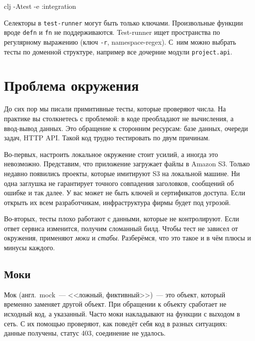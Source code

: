 \begin{english}
  \begin{bash}
clj -Atest -e :integration
  \end{bash}
\end{english}

Селекторы в \verb|test-runner| могут быть только ключами. Произвольные функции
вроде \verb|defn| и \verb|fn| не поддерживаются. Test-runner ищет пространства
по регулярному выражению (ключ \verb|-r|, namespace-regex). С~ним можно выбрать
тесты по доменной структуре, например все дочерние модули \verb|project.api|.

\section{Проблема окружения}


До сих пор мы писали примитивные тесты, которые проверяют числа. На практике вы
столкнетесь с проблемой: в коде преобладают не вычисления, а ввод-вывод
данных. Это обращение к сторонним ресурсам: базе данных, очереди задач, HTTP
API. Такой код трудно тестировать по двум причинам.


Во-первых, настроить локальное окружение стоит усилий, а иногда это
невозможно. Представим, что приложение загружает файлы в Amazon S3. Только недавно
появились проекты, которые имитируют S3 на локальной машине. Ни одна заглушка не
гарантирует точного совпадения заголовков, сообщений об ошибке и так далее. У
вас может не быть ключей и сертификатов доступа. Если открыть их всем
разработчикам, инфраструктура фирмы будет под угрозой.

Во-вторых, тесты плохо работают с данными, которые не контролируют. Если ответ
сервиса изменится, получим сломанный билд. Чтобы тест не зависел от окружения,
применяют \emph{моки} и \emph{стабы}. Разберёмся, что это такое и в чём плюсы и
минусы каждого.

\subsection{Моки}

\label{test-isolation}


Мок (англ.~mock~--- <<ложный, фиктивный>>)~--- это объект, который временно
заменяет другой объект. При обращении к объекту сработает не исходный код, а
указанный. Часто моки накладывают на функции с выходом в сеть. С их помощью
проверяют, как поведёт себя код в разных ситуациях: данные получены, статус 403,
соединение не удалось.

